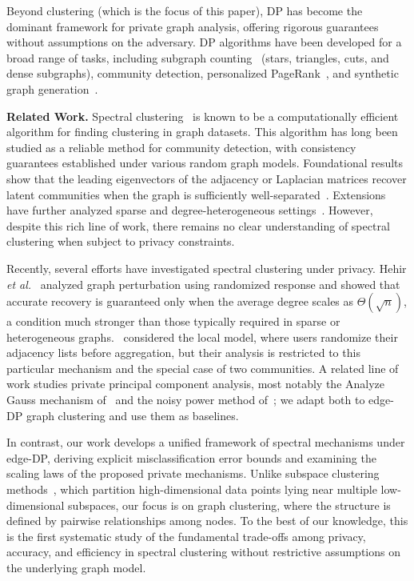 \documentclass[11pt]{article}
\theoremstyle{plain}
\theoremstyle{definition}
\theoremstyle{remark}
\begin{document}
Beyond clustering (which is the focus of this paper), DP has become the dominant framework for private graph analysis, offering rigorous guarantees without assumptions on the adversary. DP algorithms have been developed for a broad range of tasks, including subgraph counting~\citep{khayatian2025differentially, roy2025robust} (stars, triangles, cuts, and dense subgraphs), community detection, personalized PageRank~\citep{wang2013differential, epasto2022differentially}, and synthetic graph generation~\citep{nguyen2016detecting, qin2017generating, imola2021locally, blocki:itcs13, hehir2021consistency, cohen2022scalable, mohamed2022differentially}.

\textbf{Related Work.} Spectral clustering~\citep{ng2001spectral, von2007tutorial} is known to be a computationally efficient algorithm for finding clustering in graph datasets. This algorithm has long been studied as a reliable method for community detection, with consistency guarantees established under various random graph models. Foundational results show that the leading eigenvectors of the adjacency or Laplacian matrices recover latent communities when the graph is sufficiently well-separated~\citep{mcsherry2001spectral, lei2015consistency, abbe2017community}. Extensions have further analyzed sparse and degree-heterogeneous settings~\citep{qin2013regularized, le2017concentration, abbe2020entrywise}. However, despite this rich line of work, there remains no clear understanding of spectral clustering when subject to privacy constraints.

Recently, several efforts have investigated spectral clustering under privacy. Hehir \emph{et al.}~\citep{hehir2021consistency} analyzed graph perturbation using randomized response and showed that accurate recovery is guaranteed only when the average degree scales as $\Theta(\sqrt{n})$, a condition much stronger than those typically required in sparse or heterogeneous graphs.~\citet{suppakitpaisarn2025locally} considered the local model, where users randomize their adjacency lists before aggregation, but their analysis is restricted to this particular mechanism and the special case of two communities. A related line of work studies private principal component analysis, most notably the Analyze Gauss mechanism of~\citet{dwork2014analyze} and the noisy power method of~\citet{hardt2014noisy}; we adapt both to edge-DP graph clustering and use them as baselines.

In contrast, our work develops a unified framework of spectral mechanisms under edge-DP, deriving explicit misclassification error bounds and examining the scaling laws of the proposed private mechanisms. Unlike subspace clustering methods~\citep{ng2001spectral, wang2015differentially}, which partition high-dimensional data points lying near multiple low-dimensional subspaces, our focus is on graph clustering, where the structure is defined by pairwise relationships among nodes. To the best of our knowledge, this is the first systematic study of the fundamental trade-offs among privacy, accuracy, and efficiency in spectral clustering without restrictive assumptions on the underlying graph model.
\end{document}
